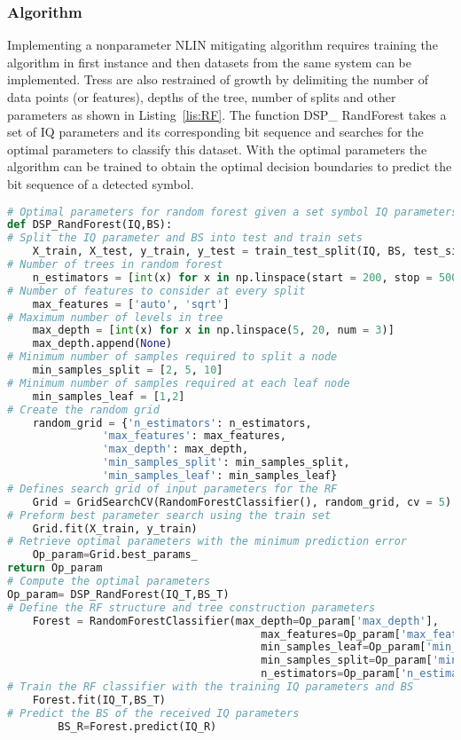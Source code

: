 \subsubsection{Algorithm}
Implementing a nonparameter NLIN mitigating algorithm requires training the algorithm in first instance and then datasets from the same system can be implemented. Tress are also restrained of growth by delimiting the number of data points (or features), depths of the tree, number of splits and other parameters as shown in Listing~\ref{lis:RF}. The function DSP\_ RandForest takes a set of IQ parameters and its corresponding bit sequence and searches for the optimal parameters to classify this dataset. With the optimal parameters the algorithm can be trained to obtain the optimal decision boundaries to predict the bit sequence of a detected symbol.    
\begin{lstlisting}[language=Python,caption=Random forest implementation in python where a optimal parameter function is defined to retrieve the optimal decision boundaries to predict over a new set of detected IQ parameters.,label=lis:RF]
# Optimal parameters for random forest given a set symbol IQ parameters and the decoded bit sequence BS
def DSP_RandForest(IQ,BS):
# Split the IQ parameter and BS into test and train sets
	X_train, X_test, y_train, y_test = train_test_split(IQ, BS, test_size = 0.2)
# Number of trees in random forest
	n_estimators = [int(x) for x in np.linspace(start = 200, stop = 500, num = 3)]
# Number of features to consider at every split
	max_features = ['auto', 'sqrt']
# Maximum number of levels in tree
	max_depth = [int(x) for x in np.linspace(5, 20, num = 3)]
	max_depth.append(None)
# Minimum number of samples required to split a node
	min_samples_split = [2, 5, 10]
# Minimum number of samples required at each leaf node
	min_samples_leaf = [1,2]
# Create the random grid
	random_grid = {'n_estimators': n_estimators,
               'max_features': max_features,
               'max_depth': max_depth,
               'min_samples_split': min_samples_split,
               'min_samples_leaf': min_samples_leaf}
# Defines search grid of input parameters for the RF 
    Grid = GridSearchCV(RandomForestClassifier(), random_grid, cv = 5)
# Preform best parameter search using the train set
    Grid.fit(X_train, y_train)
# Retrieve optimal parameters with the minimum prediction error 
    Op_param=Grid.best_params_
return Op_param
# Compute the optimal parameters
Op_param= DSP_RandForest(IQ_T,BS_T)
# Define the RF structure and tree construction parameters  
	Forest = RandomForestClassifier(max_depth=Op_param['max_depth'],
										max_features=Op_param['max_features'],
										min_samples_leaf=Op_param['min_samples_leaf'],
										min_samples_split=Op_param['min_samples_split'],
										n_estimators=Op_param['n_estimators'])
# Train the RF classifier with the training IQ parameters and BS       
    Forest.fit(IQ_T,BS_T)
# Predict the BS of the received IQ parameters 
    	BS_R=Forest.predict(IQ_R)
\end{lstlisting}



